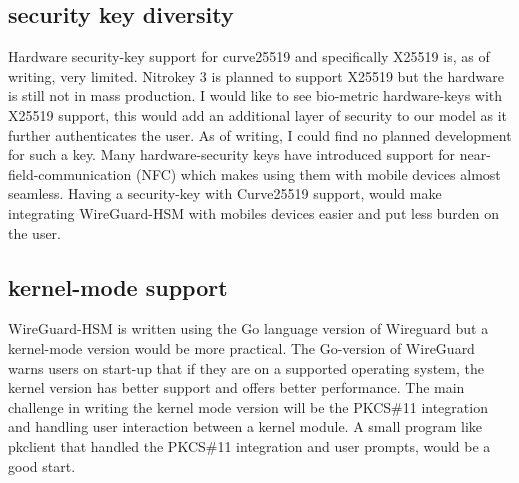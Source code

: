 \documentclass [11pt, proquest] {uwthesis}[2020/02/24]
\begin{document}
\subsection{security key diversity}
Hardware security-key support for curve25519 and specifically X25519 is, as of writing, very limited. Nitrokey 3 is planned to support X25519 but the hardware is still not in mass production. I would like to see bio-metric hardware-keys with X25519 support, this would add an additional layer of security to our model as it further authenticates the user. As of writing, I could find no planned development for such a key. Many hardware-security keys have introduced support for near-field-communication (NFC) which makes using them with mobile devices almost seamless. Having a security-key with Curve25519 support, would make integrating WireGuard-HSM with mobiles devices easier and put less burden on the user. 

\subsection{kernel-mode support}
WireGuard-HSM is written using the Go language version of Wireguard but a kernel-mode version would be more practical. The Go-version of WireGuard warns users on start-up that if they are on a supported operating system, the kernel version has better support and offers better performance. The main challenge in writing the kernel mode version will be the PKCS\#11 integration and handling user interaction between a kernel module. A small program like pkclient that handled the PKCS\#11 integration and user prompts, would be a good start. 
\end{document}
